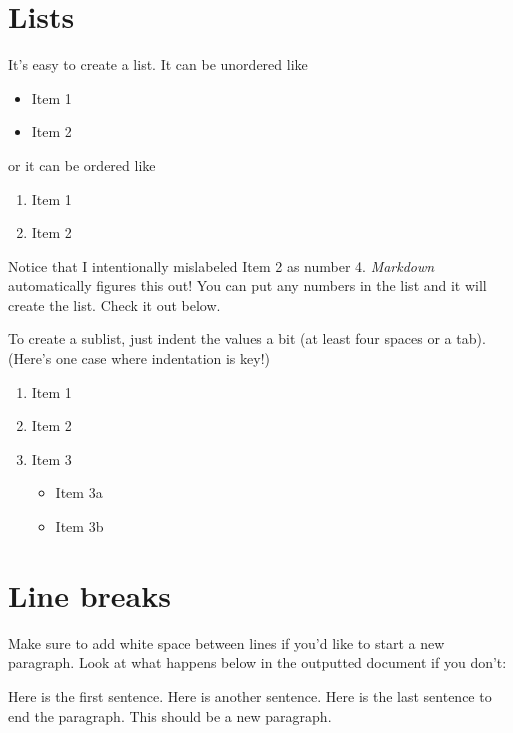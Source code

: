 \documentclass[12pt,twoside]{reedthesis}
\providecommand{\tightlist}{%
  \setlength{\itemsep}{0pt}\setlength{\parskip}{0pt}}
\begin{document}
  \section{Lists}\label{lists}
  
  It's easy to create a list. It can be unordered like
  
  \begin{itemize}
  \tightlist
  \item
    Item 1
  \item
    Item 2
  \end{itemize}
  
  or it can be ordered like
  
  \begin{enumerate}
  \def\labelenumi{\arabic{enumi}.}
  \tightlist
  \item
    Item 1
  \item
    Item 2
  \end{enumerate}
  
  Notice that I intentionally mislabeled Item 2 as number 4.
  \emph{Markdown} automatically figures this out! You can put any numbers
  in the list and it will create the list. Check it out below.
  
  To create a sublist, just indent the values a bit (at least four spaces
  or a tab). (Here's one case where indentation is key!)
  
  \begin{enumerate}
  \def\labelenumi{\arabic{enumi}.}
  \tightlist
  \item
    Item 1
  \item
    Item 2
  \item
    Item 3
  
    \begin{itemize}
    \tightlist
    \item
      Item 3a
    \item
      Item 3b
    \end{itemize}
  \end{enumerate}
  
  \section{Line breaks}\label{line-breaks}
  
  Make sure to add white space between lines if you'd like to start a new
  paragraph. Look at what happens below in the outputted document if you
  don't:
  
  Here is the first sentence. Here is another sentence. Here is the last
  sentence to end the paragraph. This should be a new paragraph.
  
\end{document}
